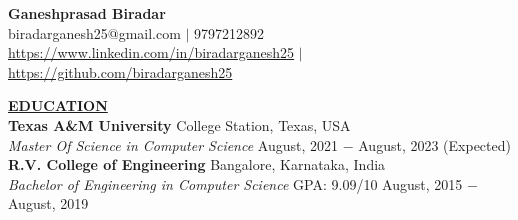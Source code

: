 \documentclass{article}
\begin{document}
\begin{center}
\large \textbf{Ganeshprasad Biradar \\}
\normalsize biradarganesh25@gmail.com $\mid$ 9797212892 \\ \url{https://www.linkedin.com/in/biradarganesh25} $\mid$ \url{https://github.com/biradarganesh25} \\
\hrulefill
\end{center}





\noindent \textbf{\underline{EDUCATION}} \\
\textbf{Texas A\&M University} \hfill College Station, Texas, USA \\
\textit{Master Of Science in Computer Science}  \hfill August, 2021 $-$ August, 2023 (Expected) \\

\noindent \textbf{R.V. College of Engineering} \hfill Bangalore, Karnataka, India \\
\textit{Bachelor of Engineering in Computer Science} \hspace{1.1cm} GPA: 9.09/10 \hfill August, 2015 $-$ August, 2019 \\
\end{document}
